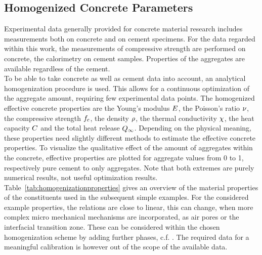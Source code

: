 \subsection{Homogenized Concrete Parameters}
Experimental data generally provided for concrete material research includes measurements both on concrete and on cement specimens.
For the data regarded within this work, the measurements of compressive strength are performed on concrete, the calorimetry on cement samples.
Properties of the aggregates are available regardless of the cement.\\

To be able to take concrete as well as cement data into account, an analytical homogenization procedure is used.
This allows for a continuous optimization of the aggregate amount, requiring few experimental data points.
The homogenized effective concrete properties are the Young's modulus $E$, the Poisson's ratio $\nu$, the compressive strength $f_{\text{c}}$, the density $\rho$, the thermal conductivity $\chi$, the heat capacity $C$ and the total heat release $Q_{\infty}$.
Depending on the physical meaning, these properties need slightly different methods to estimate the effective concrete properties.
To visualize the qualitative effect of the amount of aggregates within the concrete, effective properties are plotted for aggregate values from 0 to 1, respectively pure cement to only aggregates.
Note that both extremes are purely numerical results, not useful optimization results.
\mbox{Table \ref{tab:homogenizationproperties}} gives an overview of the material properties of the constituents used in the subsequent simple examples.
For the considered example properties, the relations are close to linear, this can change, when more complex micro mechanical mechanisms are incorporated, as air pores or the interfacial transition zone.
These can be considered within the chosen homogenization scheme by adding further phases, c.f. \cite{nee_2012_ammf}.
The required data for a meaningful calibration is however out of the scope of the available data.
